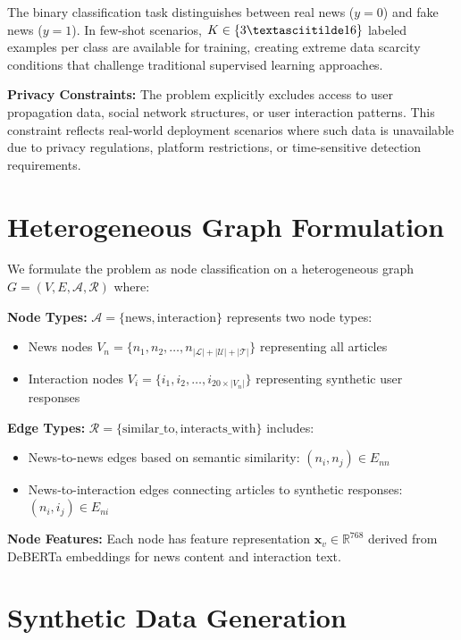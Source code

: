 The binary classification task distinguishes between real news ($y = 0$) and fake news ($y = 1$). In few-shot scenarios, $K \in \{3 \textasciitilde 16\}$ labeled examples per class are available for training, creating extreme data scarcity conditions that challenge traditional supervised learning approaches.

\textbf{Privacy Constraints:} The problem explicitly excludes access to user propagation data, social network structures, or user interaction patterns. This constraint reflects real-world deployment scenarios where such data is unavailable due to privacy regulations, platform restrictions, or time-sensitive detection requirements.

\section{Heterogeneous Graph Formulation}

We formulate the problem as node classification on a heterogeneous graph $G = (V, E, \mathcal{A}, \mathcal{R})$ where:

\textbf{Node Types:} $\mathcal{A} = \{\text{news}, \text{interaction}\}$ represents two node types:
\begin{itemize}
\item News nodes $V_n = \{n_1, n_2, \ldots, n_{|\mathcal{L}| + |\mathcal{U}| + |\mathcal{T}|}\}$ representing all articles
\item Interaction nodes $V_i = \{i_1, i_2, \ldots, i_{20 \times |V_n|}\}$ representing synthetic user responses
\end{itemize}

\textbf{Edge Types:} $\mathcal{R} = \{\text{similar\_to}, \text{interacts\_with}\}$ includes:
\begin{itemize}
\item News-to-news edges based on semantic similarity: $(n_i, n_j) \in E_{nn}$
\item News-to-interaction edges connecting articles to synthetic responses: $(n_i, i_j) \in E_{ni}$
\end{itemize}

\textbf{Node Features:} Each node has feature representation $\mathbf{x}_v \in \mathbb{R}^{768}$ derived from DeBERTa embeddings for news content and interaction text.

\section{Synthetic Data Generation}

